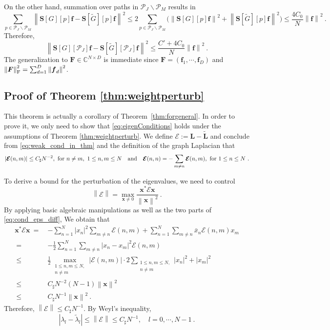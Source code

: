 \documentclass{article}
\def\l{\lambda}
\def\CC{\mathbb{C}}
\def\cP{\mathcal{P}}
\def\tG{\tilde{G}}
\def\BF{\boldsymbol{F}}
\def\BL{\boldsymbol{L}}
\def\BS{\boldsymbol{S}}
\def\Bf{\boldsymbol{f}}
\def\Bx{\boldsymbol{x}}
\def\BvE{\boldsymbol{\mathcal{E}}}
\newcommand{\F}{\textup{\mbox{F}}}
\newcommand{\abs}[1]{\left| #1 \right|}
\newcommand{\norm}[1]{\left\lVert#1\right\rVert}
\begin{document}
On the other hand, summation over paths in $\cP_J \backslash \cP_M$ results in
\begin{equation}
\sum_{p \in \cP_J \backslash \cP_M}  \norm{\BS[G][p]\Bf - \BS[\tG][p]\Bf}^2 \leq 2 \sum_{p \in \cP_J \backslash \cP_M} \Bigg( \norm{\BS[G][p]\Bf}^2 + \norm{\BS[\tG][p]\Bf}^2 \Bigg) \leq \frac{4 C_0}{N} \norm{\Bf}^2 ~.
\end{equation}
Therefore,
\begin{equation}
\norm{\BS[G][\cP_J]\Bf - \BS[\tG][\cP_J]\Bf}^2 \leq \frac{C'+4C_0}{N} \norm{\Bf}^2 ~.
\end{equation}
The generalization to $\BF \in \CC^{N \times D}$  is immediate since $\BF = (\Bf_1, \cdots, \Bf_D)$ and $\norm{\BF}_{\F}^2 = \sum_{d=1}^D \norm{\Bf_d}^2$.

\subsection{Proof of Theorem \ref{thm:weightperturb}}
{This theorem is actually a corollary of Theorem~\ref{thm:forgeneral}. In order to prove it, we only need to show that \eqref{eq:eigenConditions} holds under the assumptions of Theorem \ref{thm:weightperturb}. We define $\BvE := \BL - \tilde{\BL}$ and conclude from \eqref{eq:weak_cond_in_thm} and the definition of the graph Laplacian that  
\begin{equation}
\label{eq:cond_eps_diff}
    \abs{\BvE(n,m)} \leq C_{\sharp} N^{-2}, \textup{ for } n \neq m, \ 1 \leq n,m \leq N  ~~\textup{ and }~~ \BvE(n,n) = - \sum_{m \neq n} \BvE(n,m), \textup{ for } 1 \leq n \leq N ~.
\end{equation}}

{To derive a bound for the perturbation of the eigenvalues, we need to control  \[\norm{\BvE} = \max_{\Bx \neq 0} \frac{\Bx^* \BvE \Bx}{\norm{\Bx}^2} ~.\] 
By applying basic algebraic manipulations as well as the two parts of \eqref{eq:cond_eps_diff}, We obtain that 
\begin{equation*}
    \begin{aligned}
    \Bx^* \BvE \Bx ~=~ & - \sum_{n=1}^N \abs{x_n}^2 \sum_{m \neq n} \BvE(n,m) + \sum_{n=1}^N \sum_{m \neq n} \bar{x}_n \BvE(n,m) x_m \\ 
    ~=~ & - \frac{1}{2} \sum_{n=1}^N \sum_{m \neq n} \abs{x_n - x_m}^2 \BvE(n,m) \\
    ~\leq~ & \frac{1}{2} \max_{\substack{1 \leq n,m \leq N, \\ n \neq m}} \abs{\BvE(n,m)} \cdot 2 \sum_{\substack{1 \leq n,m \leq N, \\ n \neq m}} \abs{x_n}^2 + \abs{x_m}^2 \\
    ~\leq~ & C_{\sharp} N^{-2} (N-1) \norm{\Bx}^2 \\
    ~\leq~ & C_{\sharp} N^{-1} \norm{\Bx}^2 ~.
    \end{aligned}
\end{equation*}
Therefore, $\norm{\BvE} \leq C_{\sharp} N^{-1}$. By Weyl's inequality,
\begin{equation}
    \abs{\l_l - \tilde{\l}_l} \leq \norm{\BvE} \leq C_{\sharp} N^{-1}, \quad l = 0, \cdots, N-1 ~.
\end{equation}}
\end{document}
